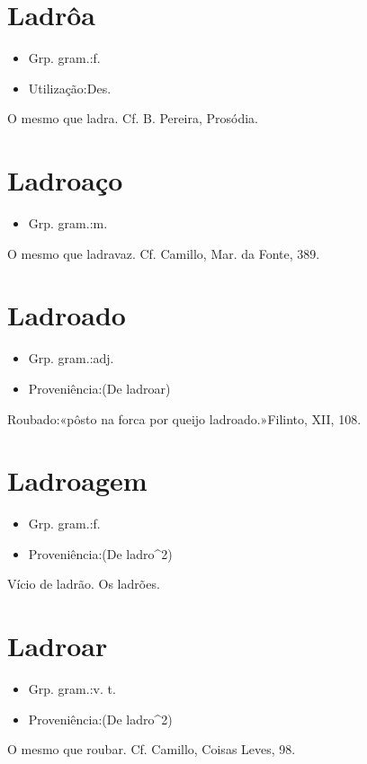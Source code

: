 \section{Ladrôa}
\begin{itemize}
\item {Grp. gram.:f.}
\end{itemize}
\begin{itemize}
\item {Utilização:Des.}
\end{itemize}
O mesmo que \textunderscore ladra\textunderscore . Cf. B. Pereira, \textunderscore Prosódia\textunderscore .
\section{Ladroaço}
\begin{itemize}
\item {Grp. gram.:m.}
\end{itemize}
O mesmo que \textunderscore ladravaz\textunderscore . Cf. Camillo, \textunderscore Mar. da Fonte\textunderscore , 389.
\section{Ladroado}
\begin{itemize}
\item {Grp. gram.:adj.}
\end{itemize}
\begin{itemize}
\item {Proveniência:(De \textunderscore ladroar\textunderscore )}
\end{itemize}
Roubado:«\textunderscore pôsto na forca por queijo ladroado.\textunderscore »Filinto, XII, 108.
\section{Ladroagem}
\begin{itemize}
\item {Grp. gram.:f.}
\end{itemize}
\begin{itemize}
\item {Proveniência:(De \textunderscore ladro\textunderscore ^2)}
\end{itemize}
Vício de ladrão.
Os ladrões.
\section{Ladroar}
\begin{itemize}
\item {Grp. gram.:v. t.}
\end{itemize}
\begin{itemize}
\item {Proveniência:(De \textunderscore ladro\textunderscore ^2)}
\end{itemize}
O mesmo que \textunderscore roubar\textunderscore . Cf. Camillo, \textunderscore Coisas Leves\textunderscore , 98.
